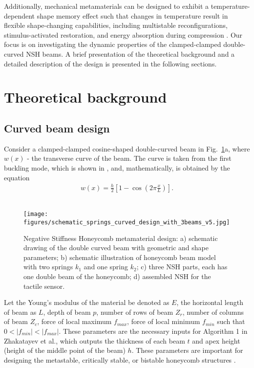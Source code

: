 \documentclass[lettersize,journal]{IEEEtran}
\begin{document}
Additionally, mechanical metamaterials can be designed to exhibit a temperature-dependent shape memory effect such that changes in temperature result in flexible shape-changing capabilities, including multistable reconfigurations, stimulus-activated restoration, and energy absorption during compression \cite{yang2023shape}. Our focus is on investigating the dynamic properties of the clamped-clamped double-curved NSH beams. A brief presentation of the theoretical background and a detailed description of the design is presented in the following sections.

\section{Theoretical background}
\label{sec:theory}

\subsection{Curved beam design}
Consider a clamped-clamped cosine-shaped double-curved beam in Fig.~\ref{honeycomb_shape}a, where \(w(x)\) - the transverse curve of the beam.
The curve is taken from the first buckling mode, which is shown in \cite{qiu2004curved}, and, mathematically, is obtained by the equation
\begin{equation}\label{eq:eq1}
\begin{aligned}
w(x)=\frac{h}{2}[1-\cos(2\pi\frac{x}{L})].
\end{aligned}
\end{equation}\\

\begin{figure}[thpb]
\centering
    \texttt{[image: figures/schematic\_springs\_curved\_design\_with\_3beams\_v5.jpg]}
\caption{Negative Stiffness Honeycomb metamaterial design: a) schematic drawing of the double curved beam with geometric and shape parameters; b) schematic illustration of honeycomb beam model with two springs $k_1$ and one spring $k_2$; c) three NSH parts, each has one double beam of the honeycomb; d) assembled NSH for the tactile sensor.}
\label{honeycomb_shape}
\vspace{0mm}
\end{figure}

Let the Young's modulus of the material be denoted as $E$, the horizontal length of beam as $L$, depth of beam $p$, number of rows of beam $Z_r$, number of columns of beam $Z_c$, force of local maximum $f_{max}$, force of local minimum $f_{min}$ such that $0 < |f_{min}| < |f_{max}|$. These parameters are the necessary inputs for Algorithm 1 in Zhakatayev et al.\cite{zhakatayev2020analytical}, which outputs the thickness of each beam $t$ and apex height (height of the middle point of the beam) $h$. These parameters are important for designing the metastable, critically stable, or bistable honeycomb structures \cite{qiu2004curved, zhakatayev2020analytical}.
\end{document}
